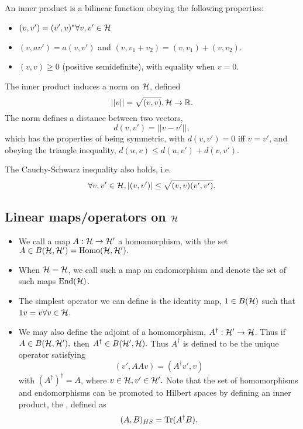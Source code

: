 An inner product is a bilinear function obeying the following properties:
\begin{itemize}
    \item $(v,v')=(v',v)^* \forall v,v' \in \mathcal H$
    \item $(v,av')=a(v,v')$ and $(v,v_1+v_2)=(v,v_1)+(v,v_2)$.
    \item $(v,v)\geq 0$  (positive semidefinite), with equality when $v=0.$
\end{itemize}
The inner product induces a norm on $\mathcal H$, defined
\begin{equation}
    ||v||=\sqrt{(v,v)}, \mathcal H \to \mathbb{R}.
\end{equation}
The norm defines a distance between two vectors,
\begin{equation}
    d(v,v')=||v-v'||,
\end{equation}
which has the properties of being symmetric, with $d(v,v')=0$ iff $v=v'$, and obeying the triangle inequality, $d(u,v) \leq d(u,v') + d(v,v').$

The Cauchy-Schwarz inequality also holds, i.e.
\begin{equation}
    \forall v, v' \in \mathcal H, |(v,v')|\leq \sqrt{(v,v) (v',v')}.
\end{equation}

\subsection*{Linear maps/operators on $\mathcal H$}
\begin{itemize}
    \item We call a map $A:\mathcal H \to \mathcal H'$ a homomorphism, with the set $A\in B(\mathcal H, \mathcal H')=\text{Homo}(\mathcal H, \mathcal H').$
    \item When $\mathcal H = \mathcal H$, we call such a map an endomorphism and denote the set of such maps $\text{End}(\mathcal H)$.
    \item The simplest operator we can define is the identity map, $1\in B(\mathcal H)$ such that $1v = v \forall v\in \mathcal H$.
    \item We may also define the adjoint of a homomorphism, $A^\dagger: \mathcal H' \to \mathcal H$. Thus if $A\in B(\mathcal H, \mathcal H'),$ then $A^\dagger \in B(\mathcal H',\mathcal H).$ Thus $A^\dagger$ is defined to be the unique operator satisfying
    \begin{equation}
        (v',AAv) = (A^\dagger v',v)
    \end{equation}
    with $(A^\dagger)^\dagger = A$, where $v\in \mathcal H, v' \in \mathcal H'.$ Note that the set of homomorphisms and endomorphisms can be promoted to Hilbert spaces by defining an inner product, the , defined as
    \begin{equation}
        (A,B)_{HS}=\operatorname{Tr}(A^\dagger B).
    \end{equation}
\end{itemize}

